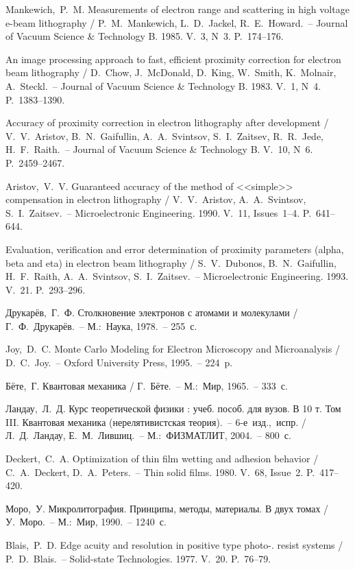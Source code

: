 \begin{thebibliography}{99}
 Mankewich,~P.~M. Measurements of electron range and scattering in
high voltage e-beam lithography / P.~M.~Mankewich, L.~D.~Jackel,
R.~E.~Howard.~-- Journal of Vacuum Science \& Technology B. 1985. V.~3, N~3.
P.~174--176.

 An image processing approach to fast, efficient proximity correction for
electron beam lithography / D.~Chow, J.~McDonald, D.~King, W.~Smith,
K.~Molnair, A.~Steckl.~-- Journal of Vacuum Science \& Technology B. 1983.
V.~1, N~4. P.~1383--1390.

 Accuracy of proximity correction in electron lithography after
development / V.~V.~Aristov, B.~N.~Gaifullin, A.~A.~Svintsov, S.~I.~Zaitsev,
R.~R.~Jede, H.~F.~Raith.~-- Journal of Vacuum Science \& Technology B. V.~10,
N~6. P.~2459--2467.

 Aristov,~V.~V. Guaranteed accuracy of the method of <<simple>>
compensation in electron lithography / V.~V.~Aristov, A.~A.~Svintsov,
S.~I.~Zaitsev.~-- Microelectronic Engineering. 1990. V.~11, Issues~1--4.
P.~641--644.

 Evaluation, verification and error determination of proximity
parameters (alpha, beta and eta) in electron beam lithography / S.~V.~Dubonos,
B.~N.~Gaifullin, H.~F.~Raith, A.~A.~Svintsov, S.~I.~Zaitsev.~-- Microelectronic
Engineering. 1993. V.~21. P.~293--296.

 Друкарёв,~Г.~Ф. Столкновение электронов с атомами и молекулами /
Г.~Ф.~Друкарёв.~-- М.:~Наука, 1978.~-- 255~с.

 Joy,~D.~C. Monte Carlo Modeling for Electron Microscopy and
Microanalysis / D.~C.~Joy.~-- Oxford University Press, 1995.~-- 224~p.

 Бёте,~Г. Квантовая механика / Г.~Бёте.~-- М.:~Мир, 1965.~-- 333~с.

 Ландау,~Л.~Д. Курс теоретической физики : учеб. пособ. для вузов.
В 10 т. Том III. Квантовая механика (нерелятивистская теория).~--
6-е~изд.,~испр. / Л.~Д.~Ландау, Е.~М.~Лившиц.~-- М.:~ФИЗМАТЛИТ, 2004.~-- 800~с.

 Deckert,~C.~A. Optimization of thin film wetting and adhesion
behavior / C.~A.~Deckert, D.~A.~Peters.~-- Thin solid films. 1980. V.~68,
Issue~2. P.~417--420.

 Моро,~У. Микролитография. Принципы, методы, материалы. В двух
томах / У.~Моро.~-- М.:~Мир, 1990.~-- 1240~с.

 Blais,~P.~D. Edge acuity and resolution in positive type photo-.
resist systems / P.~D.~Blais.~-- Solid-state Technologies. 1977. V.~20.
P.~76--79.


\end{thebibliography}
